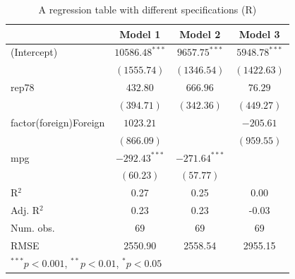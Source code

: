 \begin{frame}

\begin{table}
\scriptsize

\begin{tabular}{l c c c }
\hline
 & Model 1 & Model 2 & Model 3 \\
\hline
(Intercept)            & $10586.48^{***}$ & $9657.75^{***}$ & $5948.78^{***}$ \\
                       & $(1555.74)$      & $(1346.54)$     & $(1422.63)$     \\
rep78                  & $432.80$         & $666.96$        & $76.29$         \\
                       & $(394.71)$       & $(342.36)$      & $(449.27)$      \\
factor(foreign)Foreign & $1023.21$        &                 & $-205.61$       \\
                       & $(866.09)$       &                 & $(959.55)$      \\
mpg                    & $-292.43^{***}$  & $-271.64^{***}$ &                 \\
                       & $(60.23)$        & $(57.77)$       &                 \\
\hline
R$^2$                  & 0.27             & 0.25            & 0.00            \\
Adj. R$^2$             & 0.23             & 0.23            & -0.03           \\
Num. obs.              & 69               & 69              & 69              \\
RMSE                   & 2550.90          & 2558.54         & 2955.15         \\
\hline
\multicolumn{4}{l}{\scriptsize{$^{***}p<0.001$, $^{**}p<0.01$, $^*p<0.05$}}
\end{tabular}
\normalsize
\caption{A regression table with different specifications (R)}
\end{table}

\end{frame}

